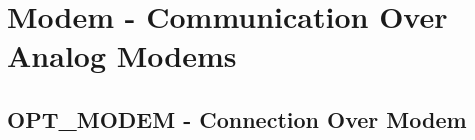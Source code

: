 \section{Modem - Communication Over Analog Modems}

\subsection {OPT\_MODEM - Connection Over Modem}


